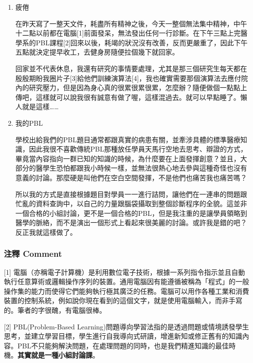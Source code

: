 \documentclass[a5paper, 12pt
]{book}
\begin{document}
\begin{enumerate}
\def\labelenumi{\arabic{enumi}.}
\item
  疲倦

  在昨天寫了一整天文件，耗盡所有精神之後，今天一整個無法集中精神，中午十二點以前都在電腦{[}1{]}前面發呆，無法發出任何一行診斷。在下午三點上完醫學系的PBL課程{[}2{]}回來以後，耗竭的狀況沒有改善，反而更嚴重了，因此下午五點就決定提早收工，去健身房隨便拉個幾下就回家。

  回家並不代表休息，我還有研究的事情要處理，尤其是那三個研究生每天都在殷殷期盼我圈片子{[}3{]}給他們訓練演算法{[}4{]}，我也確實需要那個演算法去應付院內的研究壓力，但是因為身心真的很累很累很累，怎麼辦？隨便做個一點點上傳吧，這樣就可以說我很有誠意有做了喔，這樣混過去。就可以早點睡了。懶人就是這樣\ldots\ldots{}
\item
  我的PBL

  學校出給我們的PBL題目通常都跟真實的病患有關，並牽涉具體的標準醫療知識，因此我很不喜歡傳統PBL那種放任學員天馬行空地去思考、辯證的方式，畢竟當內容指向一群已知的知識的時候，為什麼要在上面發揮創意？並且，大部分的醫學生恐怕都跟我小時候一樣，並無法很熱心地去參與這種奇怪也沒有意義的討論。那麼硬是叫他們在空白空間發揮，不是他們也痛苦我也痛苦嗎？

  所以我的方式是直接根據題目對學員一一進行詰問，讓他們在一連串的問題跟忙亂的資料查詢中，以自己的力量跟腦袋攝取到整個診斷程序的全貌。這並非一個合格的小組討論，更不是一個合格的PBL，但是我注重的是讓學員領略到醫學的脈絡，而不是演出一個形式上看起來很美麗的討論。或許我是錯的吧？反正我就這樣做了。
\end{enumerate}

\hypertarget{ux6ce8ux91cb-comment-2}{%
\subsubsection{注釋 Comment}\label{ux6ce8ux91cb-comment-2}}

{[}1{]}
電腦（亦稱電子計算機）是利用數位電子技術，根據一系列指令指示並且自動執行任意算術或邏輯操作序列的裝置。通用電腦因有能遵循被稱為「程式」的一般操作集的能力而使得它們能夠執行極其廣泛的任務。電腦可以用作各種工業和消費裝置的控制系統，例如說你現在看到的這個文字，就是使用電腦輸入，而非手寫的。筆者的字很醜，有電腦很棒。

{[}2{]} PBL(Problem-Based
Learning)問題導向學習法指的是透過問題或情境誘發學生思考，並建立學習目標，學生進行自我導向式研讀，增進新知或修正舊有的知識內容。PBL不只能夠解決問題，在處理問題的同時，也是我們精進知識的最佳時機。\textbf{其實就是一種小組討論課}。
\end{document}
